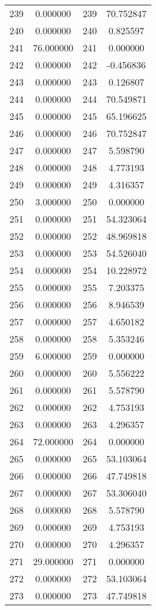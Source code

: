 \documentclass[12pt]{article}
\begin{document}
\begin{longtable}{@{}cccc@{}}
239 & 0.000000 & 239 & 70.752847 \\
240 & 0.000000 & 240 & 0.825597 \\
241 & 76.000000 & 241 & 0.000000 \\
242 & 0.000000 & 242 & -0.456836 \\
243 & 0.000000 & 243 & 0.126807 \\
244 & 0.000000 & 244 & 70.549871 \\
245 & 0.000000 & 245 & 65.196625 \\
246 & 0.000000 & 246 & 70.752847 \\
247 & 0.000000 & 247 & 5.598790 \\
248 & 0.000000 & 248 & 4.773193 \\
249 & 0.000000 & 249 & 4.316357 \\
250 & 3.000000 & 250 & 0.000000 \\
251 & 0.000000 & 251 & 54.323064 \\
252 & 0.000000 & 252 & 48.969818 \\
253 & 0.000000 & 253 & 54.526040 \\
254 & 0.000000 & 254 & 10.228972 \\
255 & 0.000000 & 255 & 7.203375 \\
256 & 0.000000 & 256 & 8.946539 \\
257 & 0.000000 & 257 & 4.650182 \\
258 & 0.000000 & 258 & 5.353246 \\
259 & 6.000000 & 259 & 0.000000 \\
260 & 0.000000 & 260 & 5.556222 \\
261 & 0.000000 & 261 & 5.578790 \\
262 & 0.000000 & 262 & 4.753193 \\
263 & 0.000000 & 263 & 4.296357 \\
264 & 72.000000 & 264 & 0.000000 \\
265 & 0.000000 & 265 & 53.103064 \\
266 & 0.000000 & 266 & 47.749818 \\
267 & 0.000000 & 267 & 53.306040 \\
268 & 0.000000 & 268 & 5.578790 \\
269 & 0.000000 & 269 & 4.753193 \\
270 & 0.000000 & 270 & 4.296357 \\
271 & 29.000000 & 271 & 0.000000 \\
272 & 0.000000 & 272 & 53.103064 \\
273 & 0.000000 & 273 & 47.749818 \\

\end{longtable}
\end{document}
